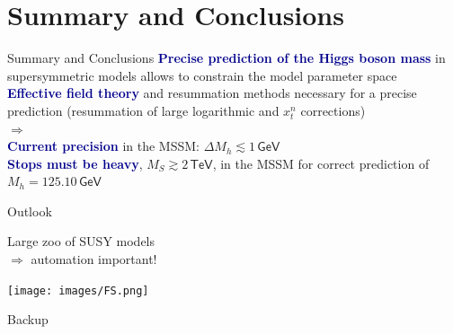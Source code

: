 \documentclass[hyperref={pdfpagelabels=false},ngerman]{beamer}
\newcommand{\eh}[1]{\,\mathsf{#1}}
\newcommand{\MS}{\ensuremath{M_S}}
\renewcommand{\emph}[1]{\textbf{\textcolor{darkblue}{#1}}}
\newcommand{\GeV}{\eh{GeV}}
\newcommand{\TeV}{\eh{TeV}}
\newcommand{\DMh}{\ensuremath{\Delta M_h}}
\begin{document}
\section{Summary and Conclusions}


\begin{frame}{Summary and Conclusions}
  \emph{Precise prediction of the Higgs boson mass} in supersymmetric
  models allows to constrain the model parameter space
  \\[1em]
  \emph{Effective field theory} and resummation methods necessary for
  a precise prediction (resummation of large logarithmic and $x_t^n$
  corrections)
  \\[1em]
  $\Rightarrow$
  \\[1em]
  \emph{Current precision} in the MSSM: $\DMh \lesssim 1\GeV$
  \\[1em]
  \emph{Stops must be heavy}, $\MS \gtrsim 2\TeV$, in the MSSM for
  correct prediction of $M_h = 125.10\GeV$
\end{frame}


\begin{frame}{Outlook}
  \begin{center}
    \LARGE Large zoo of SUSY models\\ $\Rightarrow$ automation important!
  \end{center}
  \begin{center}
    \texttt{[image: images/FS.png]}
  \end{center}
\end{frame}


\begin{frame}[noframenumbering]
  \begin{center}
    \Huge Backup
  \end{center}
\end{frame}

\end{document}
